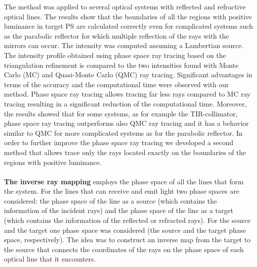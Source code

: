 The method was applied to several optical systems with reflected and refractive optical lines. The results show that the boundaries of all the regions with positive luminance in target PS are calculated correctly even for complicated systems such as the parabolic reflector for which multiple reflection of the rays with the mirrors can occur. 
The intensity was computed assuming a Lambertian source. 
The intensity profile obtained using phase space ray tracing based on the triangulation refinement is compared to the two intensities found with Monte Carlo (MC) and Quasi-Monte Carlo (QMC) ray tracing. Significant advantages in terms of the accuracy and the computational time were observed with our method. Phase space ray tracing allows tracing far less rays compared to MC ray tracing resulting in a significant reduction of the computational time. Moreover, the results showed that for some systems, as for example the TIR-collimator, phase space ray tracing outperforms also QMC ray tracing and it has a behavior similar to QMC for more complicated systems as for the parabolic reflector.
In order to further improve the phase space ray tracing we developed a second method that allows trace only the rays located exactly on the boundaries of the regions with positive luminance. 
\\ \\ \indent \textbf{The inverse ray mapping} employs the phase space of all the lines that form the system. For the lines that can receive and emit light two phase spaces are considered: the phase space of the line as a source (which contains the information of the incident rays) and the phase space of the line as a target (which contains the information of the reflected or refracted rays). For the source and the target one phase space was considered (the source and the target phase space, respectively). The idea was to construct an inverse map from the target to the source that connects the coordinates of the rays on the phase space of each optical line that it encounters. \\ \indent 
